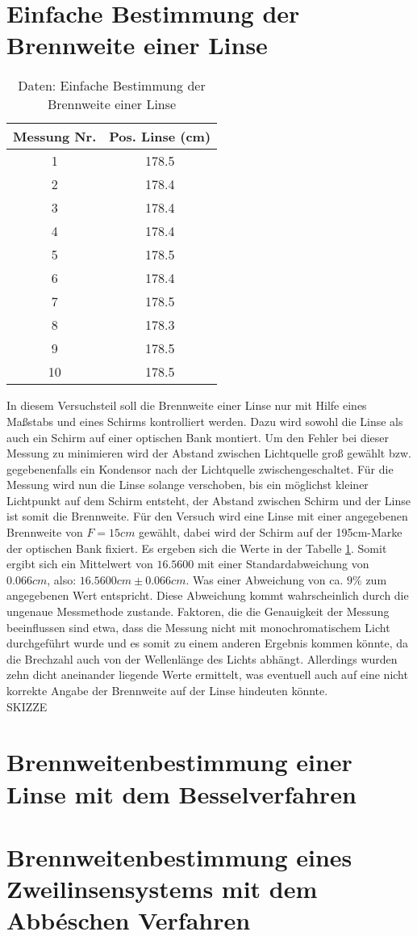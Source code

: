 \section{Einfache Bestimmung der Brennweite einer Linse}
\begin{table}[]
    \centering
    \begin{tabular}{|c|c|}
    	\hline
    	Messung Nr. & Pos. Linse (cm) \\
    	\hline
    	1 & 178.5 \\
    	\hline
    	2 & 178.4 \\
    	\hline
    	3 & 178.4 \\
    	\hline
    	4 & 178.4 \\
    	\hline
    	5 & 178.5 \\
    	\hline
    	6 & 178.4 \\
    	\hline
    	7 & 178.5 \\
    	\hline
    	8 & 178.3 \\
    	\hline
    	9 & 178.5 \\
    	\hline
    	10 & 178.5 \\
    	\hline
    
    \end{tabular}
    \caption{Daten: Einfache Bestimmung der Brennweite einer Linse}
    \label{tab:Daten1}
\end{table}


In diesem Versuchsteil soll die Brennweite einer Linse nur mit Hilfe eines Maßstabs und eines Schirms kontrolliert werden. Dazu wird sowohl die Linse als auch ein Schirm auf einer optischen Bank montiert. Um den Fehler bei dieser Messung zu minimieren wird der Abstand zwischen Lichtquelle groß gewählt bzw. gegebenenfalls ein Kondensor nach der Lichtquelle zwischengeschaltet. Für die Messung wird nun die Linse solange verschoben, bis ein möglichst kleiner Lichtpunkt auf dem Schirm entsteht, der Abstand zwischen Schirm und der Linse ist somit die Brennweite. Für den Versuch wird eine Linse mit einer angegebenen Brennweite von $F = 15 cm$ gewählt, dabei wird der Schirm auf der 195cm-Marke der optischen Bank fixiert. Es ergeben sich die Werte in der Tabelle \ref{tab:Daten1}. Somit ergibt sich ein Mittelwert von $16.5600$ mit einer Standardabweichung von $0.066cm$, also: $16.5600cm \pm 0.066cm$. Was einer Abweichung von ca. $9 \% $ zum angegebenen Wert entspricht. Diese Abweichung kommt wahrscheinlich durch die ungenaue Messmethode zustande. Faktoren, die die Genauigkeit der Messung beeinflussen sind etwa, dass die Messung nicht mit monochromatischem Licht durchgeführt wurde und es somit zu einem anderen Ergebnis kommen könnte, da die Brechzahl auch von der Wellenlänge des Lichts abhängt. Allerdings wurden zehn dicht aneinander liegende Werte ermittelt, was eventuell auch auf eine nicht korrekte Angabe der Brennweite auf der Linse hindeuten könnte.
\\
SKIZZE

\section{Brennweitenbestimmung einer Linse mit dem Besselverfahren}
\section{Brennweitenbestimmung eines Zweilinsensystems mit dem Abbéschen Verfahren}